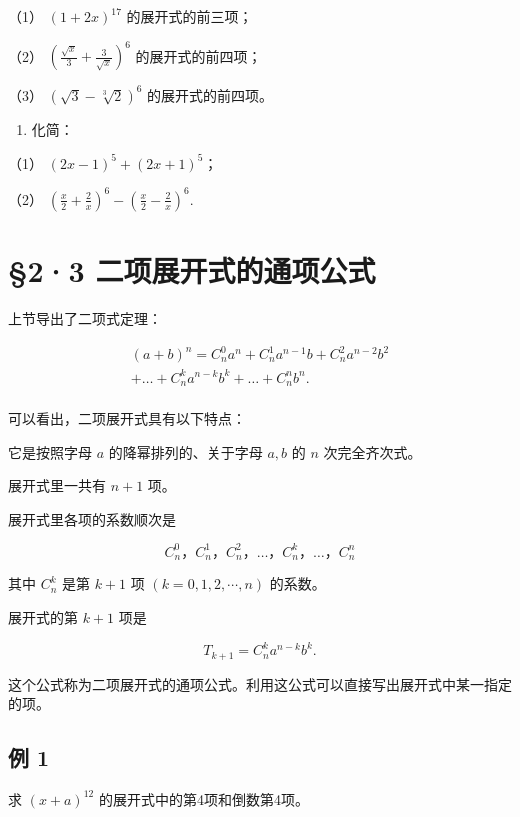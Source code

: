（1） \((1 + 2x)^{17}\) 的展开式的前三项；

（2） \(\left(\frac{\sqrt{x}}{3} + \frac{3}{\sqrt{x}}\right)^6\)
的展开式的前四项；

（3） \((\sqrt{3} - \sqrt[3]{2})^6\) 的展开式的前四项。

\begin{enumerate}[start=4]
\item
  化简：
\end{enumerate}

（1） \((2x - 1)^{5} + (2x + 1)^{5}\)；

（2）
\(\left(\frac{x}{2} + \frac{2}{x}\right)^6 - \left(\frac{x}{2} - \frac{2}{x}\right)^6.\)

\section{§2·3 二项展开式的通项公式}

上节导出了二项式定理：

\[
\begin{array}{l} (a + b) ^ {n} = C _ {n} ^ {0} a ^ {n} + C _ {n} ^ {1} a ^ {n - 1} b + C _ {n} ^ {2} a ^ {n - 2} b ^ {2} \\ + \dots + C _ {n} ^ {k} a ^ {n - k} b ^ {k} + \dots + C _ {n} ^ {n} b ^ {n}. \\ \end{array}
\]

可以看出，二项展开式具有以下特点：

它是按照字母 \(a\) 的降幂排列的、关于字母 \(a, b\) 的 \(n\)
次完全齐次式。

展开式里一共有 \(n + 1\) 项。

展开式里各项的系数顺次是

\[
C _ {n} ^ {0}\text{，} C _ {n} ^ {1}\text{，} C _ {n} ^ {2}\text{，} \dots \text{，} C _ {n} ^ {k}\text{，} \dots \text{，} C _ {n} ^ {n}
\]

其中 \(C_{n}^{k}\) 是第 \(k+1\) 项 \((k=0,1,2,\cdots,n)\) 的系数。

展开式的第 \(k + 1\) 项是

\[
\boxed {T _ {k + 1} = C _ {n} ^ {k} a ^ {n - k} b ^ {k}.}
\]

这个公式称为二项展开式的通项公式。利用这公式可以直接写出展开式中某一指定的项。

\subsection{例 1}

求 \((x + a)^{12}\) 的展开式中的第4项和倒数第4项。

